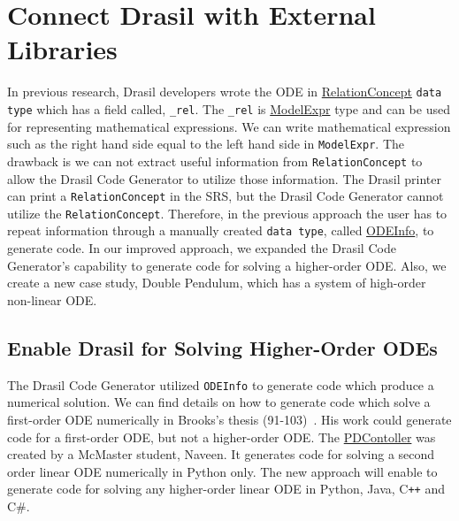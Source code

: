 \section{Connect Drasil with External Libraries}
\label{se_connecteetolib}

In previous research, Drasil developers wrote the ODE in \href{https://jacquescarette.github.io/Drasil/docs/full/drasil-lang-0.1.60.0/Language-Drasil-Chunk-Relation.html#t:RelationConcept}{RelationConcept} \verb|data type| which has a field called, \verb|_rel|. The \verb|_rel| is \href{https://jacquescarette.github.io/Drasil/docs/full/drasil-lang-0.1.60.0/Language-Drasil-ModelExpr-Lang.html#t:ModelExpr}{ModelExpr} type and can be used for representing mathematical expressions. We can write mathematical expression such as the right hand side equal to the left hand side in \verb|ModelExpr|. The drawback is we can not extract useful information from \verb|RelationConcept| to allow the Drasil Code Generator to utilize those information. The Drasil printer can print a \verb|RelationConcept| in the SRS, but the Drasil Code Generator cannot utilize the \verb|RelationConcept|. Therefore, in the previous approach the user has to repeat information through a manually created \verb|data type|, called \href{https://jacquescarette.github.io/Drasil/docs/drasil-code-0.1.9.0/Language-Drasil-Code.html#t:ODEInfo}{ODEInfo}, to generate code. In our improved approach, we expanded the Drasil Code Generator's capability to generate code for solving a higher-order ODE. Also, we create a new case study, Double Pendulum, which has a system of high-order non-linear ODE.

\subsection{Enable Drasil for Solving Higher-Order ODEs}
The Drasil Code Generator utilized \verb|ODEInfo| to generate code which produce a numerical solution. We can find details on how to generate code which solve a first-order ODE numerically in Brooks's thesis (91-103)~\citep{brooks}. His work could generate code for a first-order ODE, but not a higher-order ODE. The \href{https://jacquescarette.github.io/Drasil/examples/pdcontroller/SRS/srs/PDController_SRS.html}{PDContoller} was created by a McMaster student, Naveen. It generates code for solving a second order linear ODE numerically in Python only. The new approach will enable to generate code for solving any higher-order linear ODE in Python, Java, C\texttt{++} and C\#.


